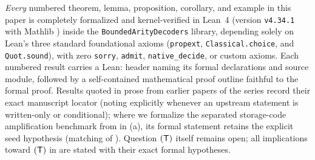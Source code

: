 \emph{Every} numbered theorem, lemma, proposition, corollary, and example in this paper is
completely formalized and kernel-verified in Lean~4 (version \texttt{v4.34.1} with Mathlib
\cite{Mathlib2026}) inside the \texttt{BoundedArityDecoders} library, depending solely on Lean's
three standard foundational axioms (\texttt{propext}, \texttt{Classical.choice}, and
\texttt{Quot.sound}), with zero \texttt{sorry}, \texttt{admit}, \texttt{native\_decide}, or custom
axioms. Each numbered result carries a \textsf{Lean:} header naming its formal declarations and
source module, followed by a self-contained mathematical proof outline faithful to the formal proof.
Results quoted in prose from earlier papers of the series record their exact manuscript locator
(noting explicitly whenever an upstream statement is written-only or conditional); where we
formalize the separated storage-code amplification benchmark from \cite{HighRate2026} in
(a), its formal statement retains the explicit seed hypothesis
 (matching  of
\cite[Definition~5.1]{HighRate2026}). Question $(\mathsf{T})$ itself
remains open; all implications toward $(\mathsf{T})$ in  are stated with their exact formal
hypotheses.
